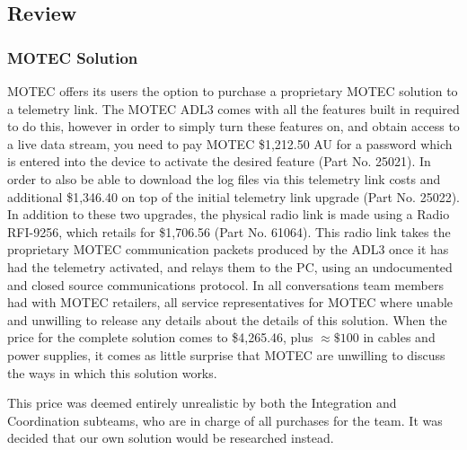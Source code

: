 \subsection{Review}
\subsubsection{MOTEC Solution}
MOTEC offers its users the option to purchase a proprietary MOTEC solution to a telemetry link. The MOTEC ADL3 comes with all the features built in required to do this, however in order to simply turn these features on, and obtain access to a live data stream, you need to pay MOTEC \$1,212.50 AU for a password which is entered into the device to activate the desired feature (Part No. 25021\cite{MOTEC_prices}). In order to also be able to download the log files via this telemetry link costs and additional \$1,346.40 on top of the initial telemetry link upgrade (Part No. 25022\cite{MOTEC_prices}). In addition to these two upgrades, the physical radio link is made using a Radio RFI-9256, which retails for \$1,706.56 (Part No. 61064). This radio link takes the proprietary MOTEC communication packets produced by the ADL3 once it has had the telemetry activated, and relays them to the PC, using an undocumented and closed source communications protocol. In all conversations team members had with MOTEC retailers, all service representatives for MOTEC where unable and unwilling to release any details about the details of this solution. When the price for the complete solution comes to \$4,265.46, plus $\approx \$100$ in cables and power supplies, it comes as little surprise that MOTEC are unwilling to discuss the ways in which this solution works. 

This price was deemed entirely unrealistic by both the Integration and Coordination subteams, who are in charge of all purchases for the team. It was decided that our own solution would be researched instead.

